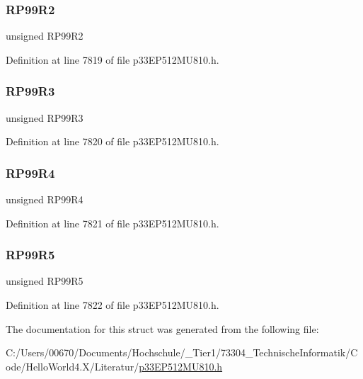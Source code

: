 \subsubsection{\texorpdfstring{R\+P99\+R2}{RP99R2}}
{\footnotesize\ttfamily unsigned R\+P99\+R2}



Definition at line 7819 of file p33\+E\+P512\+M\+U810.\+h.

\mbox{\label{structtag_r_p_o_r8_b_i_t_s_a420ca3def2381327e0b876be8bac3f29}} 
\subsubsection{\texorpdfstring{R\+P99\+R3}{RP99R3}}
{\footnotesize\ttfamily unsigned R\+P99\+R3}



Definition at line 7820 of file p33\+E\+P512\+M\+U810.\+h.

\mbox{\label{structtag_r_p_o_r8_b_i_t_s_a54698f5cd3e016992c6d508c4238e086}} 
\subsubsection{\texorpdfstring{R\+P99\+R4}{RP99R4}}
{\footnotesize\ttfamily unsigned R\+P99\+R4}



Definition at line 7821 of file p33\+E\+P512\+M\+U810.\+h.

\mbox{\label{structtag_r_p_o_r8_b_i_t_s_a70eca7928afc806e2ff00df24440d258}} 
\subsubsection{\texorpdfstring{R\+P99\+R5}{RP99R5}}
{\footnotesize\ttfamily unsigned R\+P99\+R5}



Definition at line 7822 of file p33\+E\+P512\+M\+U810.\+h.



The documentation for this struct was generated from the following file\+:\begin{DoxyCompactItemize}
\item 
C\+:/\+Users/00670/\+Documents/\+Hochschule/\+\_\+\+Tier1/73304\+\_\+\+Technische\+Informatik/\+Code/\+Hello\+World4.\+X/\+Literatur/\hyperlink{p33_e_p512_m_u810_8h}{p33\+E\+P512\+M\+U810.\+h}\end{DoxyCompactItemize}
